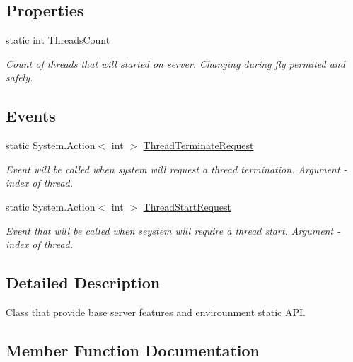 \subsection*{Properties}
\begin{DoxyCompactItemize}
\item 
static int \mbox{\hyperlink{class_uniform_server_1_1_base_server_a31cc7d436bb2dd344ec275fd0fa0061e}{Threads\+Count}}
\begin{DoxyCompactList}\small\item\em Count of threads that will started on server. Changing during fly permited and safely. \end{DoxyCompactList}\end{DoxyCompactItemize}
\subsection*{Events}
\begin{DoxyCompactItemize}
\item 
static System.\+Action$<$ int $>$ \mbox{\hyperlink{class_uniform_server_1_1_base_server_a889c3aaa1cca7f4a9a4e32617516f4be}{Thread\+Terminate\+Request}}
\begin{DoxyCompactList}\small\item\em Event will be called when system will request a thread termination. Argument -\/ index of thread. \end{DoxyCompactList}\item 
static System.\+Action$<$ int $>$ \mbox{\hyperlink{class_uniform_server_1_1_base_server_a440a854a955ab7c5e563918c12e9b32c}{Thread\+Start\+Request}}
\begin{DoxyCompactList}\small\item\em Event that will be called when seystem will require a thread start. Argument -\/ index of thread. \end{DoxyCompactList}\end{DoxyCompactItemize}


\subsection{Detailed Description}
Class that provide base server features and envirounment static A\+PI. 



\subsection{Member Function Documentation}
\mbox{\label{class_uniform_server_1_1_base_server_a992660752da60019c348e18226a87bf2}} 

